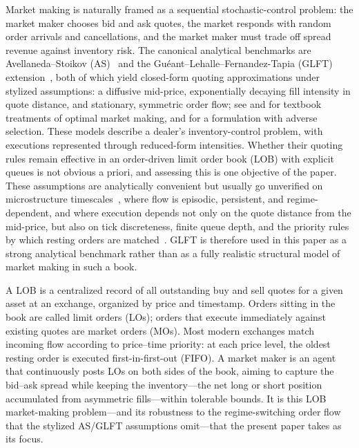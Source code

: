 \documentclass[11pt,a4paper]{article}
\begin{document}
Market making is naturally framed as a sequential stochastic-control
problem: the market maker chooses bid and ask quotes, the market
responds with random order arrivals and cancellations, and the market
maker must trade off spread revenue against inventory risk.  The
canonical analytical benchmarks are Avellaneda--Stoikov
(AS)~\citep{avellaneda2008} and the
Gu\'{e}ant--Lehalle--Fernandez-Tapia (GLFT)
extension~\citep{gueant2013dealing,gueant2017optimal}, both of which
yield closed-form quoting approximations under stylized assumptions: a
diffusive mid-price, exponentially decaying fill intensity in quote
distance, and stationary, symmetric order flow; see
\citet{cartea2015algorithmic} and \citet{gueant2016financial} for
textbook treatments of optimal market making, and \citet{cartea2014buy}
for a formulation with adverse selection.  These models describe a dealer's inventory-control problem, with
executions represented through reduced-form intensities. Whether their
quoting rules remain effective in an order-driven limit order book (LOB)
with explicit queues is not obvious a priori, and assessing this
is one objective of the paper.  These
assumptions are analytically convenient but usually go unverified on
microstructure timescales~\citep{lehalle2018market}, where flow is
episodic, persistent, and regime-dependent, and where execution
depends not only on the quote distance from the mid-price, but also on
tick discreteness, finite queue depth, and the priority rules by which
resting orders are matched~\citep{smith2003,farmer2005predictive}.
GLFT is therefore used in this paper as a strong analytical benchmark
rather than as a fully realistic structural model of market making in
such a book.

A LOB is a centralized record of all
outstanding buy and sell quotes for a given asset at an exchange,
organized by price and timestamp.  Orders sitting in the book are
called limit orders (LOs); orders that execute immediately against
existing quotes are market orders (MOs).  Most modern exchanges match
incoming flow according to price--time priority: at each price level,
the oldest resting order is executed first-in-first-out (FIFO).  A
market maker is an agent that continuously posts LOs on both
sides of the book, aiming to capture the bid--ask spread while keeping
the inventory---the net long or short position accumulated from
asymmetric fills---within tolerable bounds.  It is this LOB
market-making problem---and its robustness to the regime-switching order flow that the stylized AS/GLFT assumptions omit---that the present
paper takes as its focus.
\end{document}
